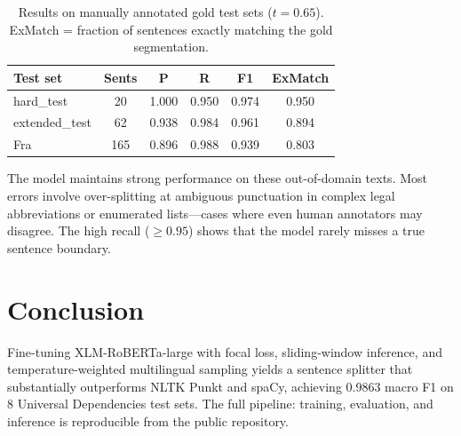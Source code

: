 \documentclass[11pt,a4paper]{article}
\begin{document}
\begin{table}[h]
\centering
\small
\begin{tabular}{lccccc}
\toprule
\textbf{Test set} & \textbf{Sents} & \textbf{P} & \textbf{R} & \textbf{F1} & \textbf{ExMatch} \\
\midrule
hard\_test       &  20  & 1.000 & 0.950 & 0.974 & 0.950 \\
extended\_test   &  62  & 0.938 & 0.984 & 0.961 & 0.894 \\
Fra              & 165  & 0.896 & 0.988 & 0.939 & 0.803 \\
\bottomrule
\end{tabular}
\caption{Results on manually annotated gold test sets ($t{=}0.65$).
ExMatch = fraction of sentences exactly matching the gold segmentation.}
\label{tab:gold}
\end{table}

The model maintains strong performance on these out-of-domain texts.
Most errors involve over-splitting at ambiguous punctuation in complex legal
abbreviations or enumerated lists---cases where even human annotators may
disagree. The high recall (${\geq}0.95$) shows that the model rarely misses
a true sentence boundary.

\section{Conclusion}

Fine-tuning XLM-RoBERTa-large with focal loss, sliding-window inference, and
temperature-weighted multilingual sampling yields a sentence splitter that
substantially outperforms NLTK Punkt and spaCy, achieving 0.9863 macro F1 on
8 Universal Dependencies test sets. The full pipeline: training, evaluation, and
inference is reproducible from the public repository.
\end{document}
